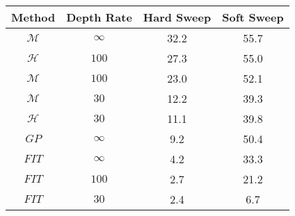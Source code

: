 \begin{tabular}{c|c|c|c}
Method	&Depth Rate	&Hard Sweep	&Soft Sweep\\\hline
$\mathcal{M}$	&$\infty$	&32.2	&55.7\\
$\mathcal{H}$	&$100$	&27.3	&55.0\\
$\mathcal{M}$	&$100$	&23.0	&52.1\\
$\mathcal{M}$	&$30$	&12.2	&39.3\\
$\mathcal{H}$	&$30$	&11.1	&39.8\\
$GP$	&$\infty$	&9.2	&50.4\\
$FIT$	&$\infty$	&4.2	&33.3\\
$FIT$	&$100$	&2.7	&21.2\\
$FIT$	&$30$	&2.4	&6.7\\
\end{tabular}
